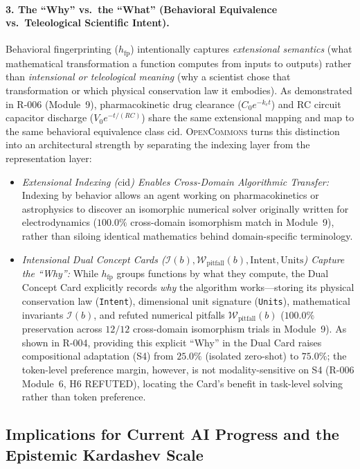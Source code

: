 \documentclass[10pt,twocolumn]{article}
\begin{document}
\paragraph{3. The ``Why'' vs.\ the ``What'' (Behavioral Equivalence vs.\ Teleological Scientific Intent).}
Behavioral fingerprinting ($h_{\text{fp}}$) intentionally captures \emph{extensional semantics} (what mathematical transformation a function computes from inputs to outputs) rather than \emph{intensional or teleological meaning} (why a scientist chose that transformation or which physical conservation law it embodies). As demonstrated in R-006 (Module~9), pharmacokinetic drug clearance ($C_0 e^{-k_e t}$) and RC circuit capacitor discharge ($V_0 e^{-t/(RC)}$) share the same extensional mapping and map to the same behavioral equivalence class $\text{cid}$. \textsc{OpenCommons} turns this distinction into an architectural strength by separating the indexing layer from the representation layer:
\begin{itemize}
    \item \emph{Extensional Indexing ($\text{cid}$) Enables Cross-Domain Algorithmic Transfer:} Indexing by behavior allows an agent working on pharmacokinetics or astrophysics to discover an isomorphic numerical solver originally written for electrodynamics ($100.0\%$ cross-domain isomorphism match in Module~9), rather than siloing identical mathematics behind domain-specific terminology.
    \item \emph{Intensional Dual Concept Cards ($\mathcal{I}(b), \mathcal{W}_{\text{pitfall}}(b), \text{Intent}, \text{Units}$) Capture the ``Why'':} While $h_{\text{fp}}$ groups functions by what they compute, the Dual Concept Card explicitly records \emph{why} the algorithm works—storing its physical conservation law (\texttt{Intent}), dimensional unit signature (\texttt{Units}), mathematical invariants $\mathcal{I}(b)$, and refuted numerical pitfalls $\mathcal{W}_{\text{pitfall}}(b)$ ($100.0\%$ preservation across $12/12$ cross-domain isomorphism trials in Module~9). As shown in R-004, providing this explicit ``Why'' in the Dual Card raises compositional adaptation (S4) from $25.0\%$ (isolated zero-shot) to $75.0\%$; the token-level preference margin, however, is not modality-sensitive on S4 (R-006 Module~6, H6 REFUTED), locating the Card's benefit in task-level solving rather than token preference.
\end{itemize}

\subsection{Implications for Current AI Progress and the Epistemic Kardashev Scale}
\label{sec:kardashev_scale}
\end{document}
